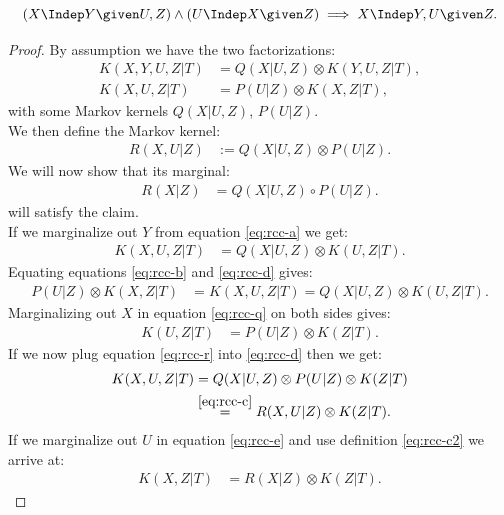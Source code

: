 \begin{Lem}
    \[ (X \Indep  Y \given U , Z) \land (U \Indep  X \given Z) \implies X  \Indep  Y , U \given Z.\]
\begin{proof}
     By assumption we have the two factorizations:
    \begin{align}
        K(X,Y,U,Z|T) & = Q(X|U,Z) \otimes K(Y,U,Z|T), \label{eq:rcc-a}\\
        K(X,U,Z|T) & = P(U|Z) \otimes K(X,Z|T), \label{eq:rcc-b}
    \end{align}
     with some Markov kernels $Q(X|U,Z)$, $P(U|Z)$.\\
     We then define the Markov kernel:
    \begin{align}
        R(X,U|Z) & := Q(X|U,Z) \otimes P(U|Z). \label{eq:rcc-c}
    \end{align}
    We will now show that its marginal: 
    \begin{align}
        R(X|Z) & = Q(X|U,Z) \circ P(U|Z). \label{eq:rcc-c2}
    \end{align} 
    will satisfy the claim.\\
    If we marginalize out $Y$ from equation \ref{eq:rcc-a} we get:
    \begin{align}
        K(X,U,Z|T) & = Q(X|U,Z) \otimes K(U,Z|T). \label{eq:rcc-d}
    \end{align}
    Equating equations \ref{eq:rcc-b} and \ref{eq:rcc-d} gives:
    \begin{align}
        P(U|Z) \otimes K(X,Z|T) &=      K(X,U,Z|T)  
                                 = Q(X|U,Z) \otimes K(U,Z|T). \label{eq:rcc-q}
    \end{align}
    Marginalizing out $X$ in equation \ref{eq:rcc-q} on both sides gives:
    \begin{align}
        K(U,Z|T) &=  P(U|Z) \otimes K(Z|T).  \label{eq:rcc-r}
    \end{align}
    If we now plug equation \ref{eq:rcc-r} into \ref{eq:rcc-d} then we get:
    \begin{align}
        K(X,U,Z|T) & = Q(X|U,Z) \otimes P(U|Z) \otimes K(Z|T) \\
            &\stackrel{\ref{eq:rcc-c}}{=} R(X,U|Z) \otimes K(Z|T). \label{eq:rcc-e}
    \end{align}
    If we marginalize out $U$ in equation \ref{eq:rcc-e} and use definition \ref{eq:rcc-c2}  we arrive at:
    \begin{align}
        K(X,Z|T) & = R(X|Z) \otimes K(Z|T). \label{eq:rcc-f}
    \end{align}

\end{proof}
\end{Lem}
